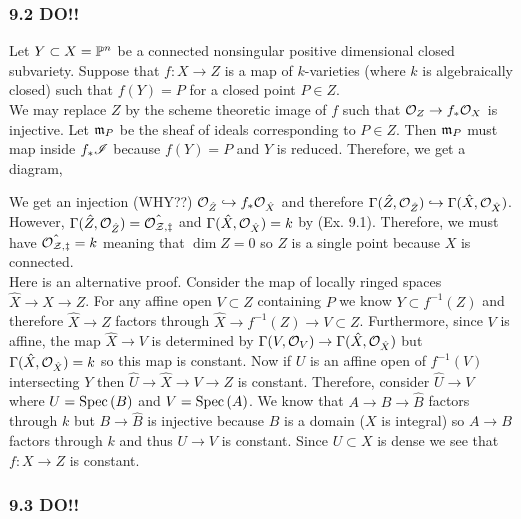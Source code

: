 \documentclass[12pt]{article}
\begin{document}
\subsubsection{9.2 DO!!}

Let $Y \subset X = \P^n$ be a connected nonsingular positive dimensional closed subvariety. Suppose that $f : X \to Z$ is a map of $k$-varieties (where $k$ is algebraically closed) such that $f(Y) = P$ for a closed point $P \in Z$.
\bigskip\\
We may replace $Z$ by the scheme theoretic image of $f$ such that $\struct{Z} \to f_* \struct{X}$ is injective. Let $\m_P$ be the sheaf of ideals corresponding to $P \in Z$. Then $\m_P$ must map inside $f_* \I$ because $f(Y) = P$ and $Y$ is reduced. Therefore, we get a diagram,
\begin{center}
\end{center} 
We get an injection (WHY??) $\struct{\hat{Z}} \embed f_* \struct{\hat{X}}$ and therefore $\Gamma(\hat{Z}, \struct{\hat{Z}}) \embed \Gamma(\hat{X}, \struct{\hat{X}})$. However, $\Gamma(\hat{Z}, \struct{\hat{Z}}) = \hat{\stalk{Z}{z}}$ and $\Gamma(\hat{X}, \struct{\hat{X}}) = k$ by (Ex. 9.1). Therefore, we must have $\hat{\stalk{Z}{z}} = k$ meaning that $\dim{Z} = 0$ so $Z$ is a single point because $X$ is connected.
\bigskip\\
Here is an alternative proof. Consider the map of locally ringed spaces $\hat{X} \to X \to Z$. For any affine open $V \subset Z$ containing $P$ we know $Y \subset f^{-1}(Z)$ and therefore $\hat{X} \to Z$ factors through $\hat{X} \to f^{-1}(Z) \to V \subset Z$. Furthermore, since $V$ is affine, the map $\hat{X} \to V$ is determined by $\Gamma(V, \struct{V}) \to \Gamma(\hat{X}, \struct{\hat{X}})$ but $\Gamma(\hat{X}, \struct{\hat{X}}) = k$ so this map is constant. Now if $U$ is an affine open of $f^{-1}(V)$ intersecting $Y$ then $\hat{U} \to \hat{X} \to V \to Z$ is constant. Therefore, consider $\hat{U} \to V$ where $U = \Spec{B}$ and $V = \Spec{A}$. We know that $A \to B \to \hat{B}$ factors through $k$ but $B \to \hat{B}$ is injective because $B$ is a domain ($X$ is integral) so $A \to B$ factors through $k$ and thus $U \to V$ is constant. Since $U \subset X$ is dense we see that $f : X \to Z$ is constant.

\subsubsection{9.3 DO!!}
\end{document}
